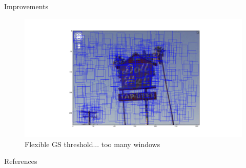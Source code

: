 \documentclass[handout]{beamer}
\begin{document}
\begin{frame}{Improvements}
\begin{figure}%
\includegraphics[width=\columnwidth]{figures/beer.png}%
\caption{Flexible GS threshold... too many windows}%
\label{}%
\end{figure}
\end{frame}





\begin{frame}{References}
\tiny


\end{frame}
\end{document}
